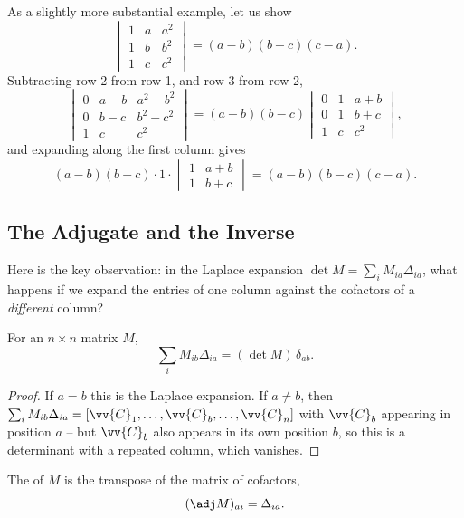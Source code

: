 \begin{example}
	As a slightly more substantial example, let us show
	$$
	\begin{vmatrix}
		1 & a & a^2 \\
		1 & b & b^2 \\
		1 & c & c^2
	\end{vmatrix} = (a - b)(b-c)(c-a).
	$$
	Subtracting row 2 from row 1, and row 3 from row 2,
	$$
	\begin{vmatrix}
		0 & a - b & a^2 - b^2 \\
		0 & b - c & b^2 - c^2 \\
		1 & c & c^2
	\end{vmatrix}
	= (a-b)(b-c)\begin{vmatrix}
		0 & 1 & a + b \\
		0 & 1 & b + c \\
		1 & c & c^2
	\end{vmatrix},
	$$
	and expanding along the first column gives
	$$
	(a-b)(b-c) \cdot 1 \cdot \begin{vmatrix}
		1 & a + b\\
		1 & b + c
	\end{vmatrix} = (a - b)(b - c)(c - a).
	$$
\end{example}

\subsection{The Adjugate and the Inverse}

Here is the key observation: in the Laplace expansion $\det M = \sum_i M_{ia}\Delta_{ia}$, what happens if we expand the entries of one column against the cofactors of a \emph{different} column?

\begin{lemma}\label{lemma:cofactor}
	For an $n \times n$ matrix $M$,
	$$
	\sum_{i} M_{ib} \Delta_{ia} = (\det M) \, \delta_{ab}.
	$$
\end{lemma}
\begin{proof}
	If $a = b$ this is the Laplace expansion. If $a \neq b$, then $\sum_i M_{ib}\Delta_{ia} = [\vv{C}_1, \dots, \vv{C}_b, \dots, \vv{C}_n]$ with $\vv{C}_b$ appearing in position $a$ -- but $\vv{C}_b$ also appears in its own position $b$, so this is a determinant with a repeated column, which vanishes.
\end{proof}

\begin{definition}[Adjugate]
	The  of $M$ is the transpose of the matrix of cofactors,
	$$
	(\adj M)_{ai} = \Delta_{ia}.
	$$
\end{definition}

